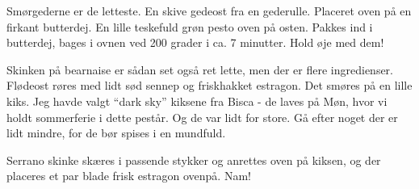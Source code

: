 \documentclass[
]{book}
\begin{document}
Smørgederne er de letteste. En skive gedeost fra en gederulle. Placeret oven på en firkant butterdej. En lille teskefuld grøn pesto oven på osten. Pakkes ind i butterdej, bages i ovnen ved 200 grader i ca. 7 minutter. Hold øje med dem!

Skinken på bearnaise er sådan set også ret lette, men der er flere ingredienser. Flødeost røres med lidt sød sennep og friskhakket estragon. Det smøres på en lille kiks. Jeg havde valgt ``dark sky'' kiksene fra Bisca - de laves på Møn, hvor vi holdt sommerferie i dette pestår. Og de var lidt for store. Gå efter noget der er lidt mindre, for de bør spises i en mundfuld.

Serrano skinke skæres i passende stykker og anrettes oven på kiksen, og der placeres et par blade frisk estragon ovenpå. Nam!
\end{document}
